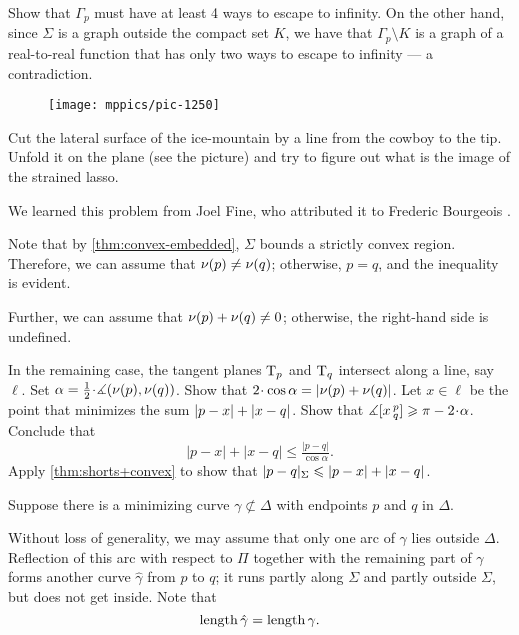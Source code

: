 \begin{multicols}{2}
Show that $\Gamma_p$ must have at least 4 ways to escape to infinity.
On the other hand, since $\Sigma$ is a graph outside the compact set $K$, we have that $\Gamma_p\setminus K$ is a graph of a real-to-real function that has only two ways to escape to infinity --- a contradiction.


\setcounter{eqtn}{0}

\begin{wrapfigure}{r}{24 mm}
\vskip-6mm
\centering
\texttt{[image: mppics/pic-1250]}
\vskip-0mm
\end{wrapfigure}

Cut the lateral surface of the ice-mountain by a line from the cowboy to the tip.
Unfold it on the plane (see the picture) and try to figure out what is the image of the strained lasso.

We learned this problem from Joel Fine, who attributed it to Frederic Bourgeois \cite{fine}.

Note that by \ref{thm:convex-embedded}, $\Sigma$ bounds a strictly convex region.
Therefore, we can assume that $\nu(p)\ne\nu(q)$; otherwise, $p=q$, and the inequality is evident.

Further, we can assume that $\Norm(p)+\Norm(q)\z\ne 0$; otherwise, the right-hand side is undefined.

In the remaining case, the tangent planes $\mathrm{T}_p$ and $\mathrm{T}_q$ intersect along a line, say $\ell$.
Set $\alpha=\tfrac12\cdot\measuredangle(\Norm(p),\Norm(q))$.
Show that $2\cdot\cos\alpha\z= |\Norm(p)+\Norm(q)|$.
Let $x\in \ell$ be the point that minimizes the sum $|p-x|\z+|x-q|$.
Show that $\measuredangle\hinge xpq\ge \pi-2\cdot\alpha$.
Conclude that 
\[|p-x|+|x-q|\le \tfrac{|p-q|}{\cos\alpha}.\]
Apply \ref{thm:shorts+convex} to show that
$\dist{p}{q}\Sigma\le |p-x|+|x-q|$.


Suppose there is a minimizing curve $\gamma\not\subset\Delta$ with endpoints $p$ and $q$ in $\Delta$.

Without loss of generality, we may assume that only one arc of $\gamma$ lies outside $\Delta$.
Reflection of this arc with respect to $\Pi$ together with the remaining part of $\gamma$ forms another curve $\hat\gamma$ from $p$ to $q$;
it runs partly along $\Sigma$ 
and partly outside $\Sigma$,
but does not get inside.
Note that
\[\mathop{\rm length}\nolimits\hat\gamma=\mathop{\rm length}\nolimits\gamma.\]



\end{multicols}
